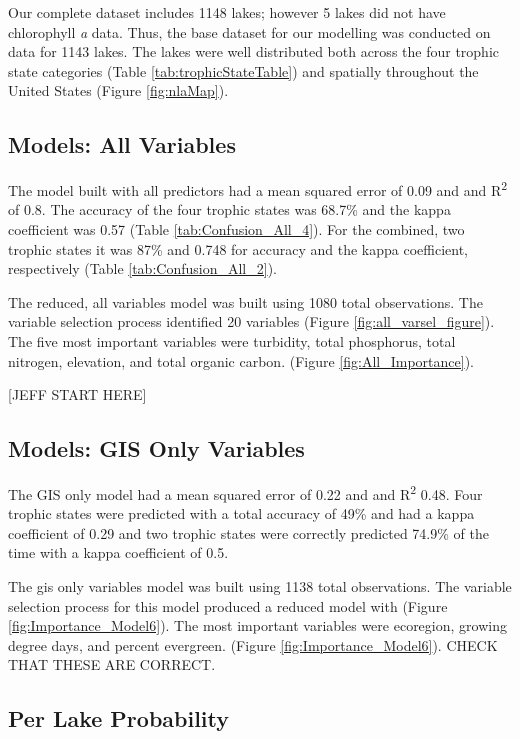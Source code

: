 \documentclass[11pt,]{article}
\begin{document}
Our complete dataset includes 1148 lakes; however 5 lakes did not have
chlorophyll \emph{a} data. Thus, the base dataset for our modelling was
conducted on data for 1143 lakes. The lakes were well distributed both
across the four trophic state categories (Table
\ref{tab:trophicStateTable}) and spatially throughout the United States
(Figure \ref{fig:nlaMap}).

\subsection{Models: All Variables}\label{models-all-variables}

The model built with all predictors had a mean squared error of 0.09 and
and R\textsuperscript{2} of 0.8. The accuracy of the four trophic states
was 68.7\% and the kappa coefficient was 0.57 (Table
\ref{tab:Confusion_All_4}). For the combined, two trophic states it was
87\% and 0.748 for accuracy and the kappa coefficient, respectively
(Table \ref{tab:Confusion_All_2}).

The reduced, all variables model was built using 1080 total
observations. The variable selection process identified 20 variables
(Figure \ref{fig:all_varsel_figure}). The five most important variables
were turbidity, total phosphorus, total nitrogen, elevation, and total
organic carbon. (Figure \ref{fig:All_Importance}).

{[}JEFF START HERE{]}

\subsection{Models: GIS Only Variables}\label{models-gis-only-variables}

The GIS only model had a mean squared error of 0.22 and and
R\textsuperscript{2} 0.48. Four trophic states were predicted with a
total accuracy of 49\% and had a kappa coefficient of 0.29 and two
trophic states were correctly predicted 74.9\% of the time with a kappa
coefficient of 0.5.

The gis only variables model was built using 1138 total observations.
The variable selection process for this model produced a reduced model
with (Figure \ref{fig:Importance_Model6}). The most important variables
were ecoregion, growing degree days, and percent evergreen. (Figure
\ref{fig:Importance_Model6}). CHECK THAT THESE ARE CORRECT.

\subsection{Per Lake Probability}\label{per-lake-probability}
\end{document}

